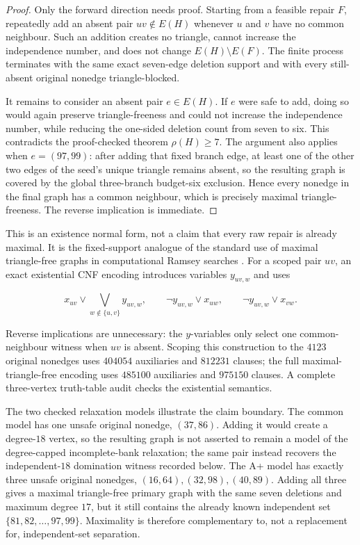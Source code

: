 \begin{proof}
Only the forward direction needs proof.  Starting from a feasible repair
\(F\), repeatedly add an absent pair \(uv\notin E(H)\) whenever \(u\) and
\(v\) have no common neighbour.  Such an addition creates no triangle,
cannot increase the independence number, and does not change
\(E(H)\setminus E(F)\).  The finite process terminates with the same exact
seven-edge deletion support and with every still-absent original nonedge
triangle-blocked.

It remains to consider an absent pair \(e\in E(H)\).  If \(e\) were safe to
add, doing so would again preserve triangle-freeness and could not increase
the independence number, while reducing the one-sided deletion count from
seven to six.  This contradicts the proof-checked theorem
\(\rho(H)\ge7\).  The argument also applies when \(e=(97,99)\): after adding
that fixed branch edge, at least one of the other two edges of the seed's
unique triangle remains absent, so the resulting graph is covered by the
global three-branch budget-six exclusion.  Hence every nonedge in the final
graph has a common neighbour, which is precisely maximal
triangle-freeness.  The reverse implication is immediate.
\end{proof}

This is an existence normal form, not a claim that every raw repair is
already maximal.  It is the fixed-support analogue of the standard use of
maximal triangle-free graphs in computational Ramsey searches
\cite{BrinkmannGoedgebeurSchlagePuchta2012}.  For a scoped pair \(uv\), an
exact existential CNF encoding introduces variables \(y_{uv,w}\) and uses

\[
 x_{uv}\vee\bigvee_{w\notin\{u,v\}}y_{uv,w},\qquad
 \neg y_{uv,w}\vee x_{uw},\qquad
 \neg y_{uv,w}\vee x_{vw}.
\]

Reverse implications are unnecessary: the \(y\)-variables only select one
common-neighbour witness when \(uv\) is absent.  Scoping this construction to
the \(4123\) original nonedges uses \(404054\) auxiliaries and \(812231\)
clauses; the full maximal-triangle-free encoding uses \(485100\) auxiliaries
and \(975150\) clauses.  A complete three-vertex truth-table audit checks the
existential semantics.

The two checked relaxation models illustrate the claim boundary.  The common
model has one unsafe original nonedge, \((37,86)\).  Adding it would create a
degree-\(18\) vertex, so the resulting graph is not asserted to remain a model
of the degree-capped incomplete-bank relaxation; the same pair instead
recovers the independent-\(18\) domination witness recorded below.  The A+
model has exactly three unsafe original nonedges,
\((16,64),(32,98),(40,89)\).  Adding all three gives a maximal triangle-free
primary graph with the same seven deletions and maximum degree \(17\), but it
still contains the already known independent set
\(\{81,82,\ldots,97,99\}\).  Maximality is therefore complementary to, not a
replacement for, independent-set separation.

